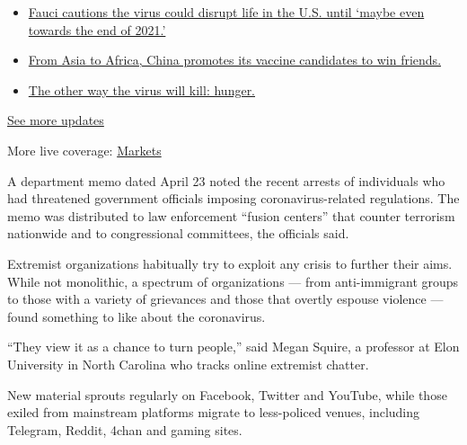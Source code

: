 \begin{itemize}
\tightlist
\item
  \href{https://www.nytimes3xbfgragh.onion/2020/09/11/world/covid-19-coronavirus.html?action=click\&pgtype=Article\&state=default\&region=MAIN_CONTENT_1\&context=storylines_live_updates\#link-dfb8a16}{Fauci
  cautions the virus could disrupt life in the U.S. until `maybe even
  towards the end of 2021.'}
\item
  \href{https://www.nytimes3xbfgragh.onion/2020/09/11/world/covid-19-coronavirus.html?action=click\&pgtype=Article\&state=default\&region=MAIN_CONTENT_1\&context=storylines_live_updates\#link-7104d154}{From
  Asia to Africa, China promotes its vaccine candidates to win friends.}
\item
  \href{https://www.nytimes3xbfgragh.onion/2020/09/11/world/covid-19-coronavirus.html?action=click\&pgtype=Article\&state=default\&region=MAIN_CONTENT_1\&context=storylines_live_updates\#link-393ad215}{The
  other way the virus will kill: hunger.}
\end{itemize}

\href{https://www.nytimes3xbfgragh.onion/2020/09/11/world/covid-19-coronavirus.html?action=click\&pgtype=Article\&state=default\&region=MAIN_CONTENT_1\&context=storylines_live_updates}{See
more updates}

More live coverage:
\href{https://www.nytimes3xbfgragh.onion/live/2020/09/11/business/stock-market-today-coronavirus?action=click\&pgtype=Article\&state=default\&region=MAIN_CONTENT_1\&context=storylines_live_updates}{Markets}

A department memo dated April 23 noted the recent arrests of individuals
who had threatened government officials imposing coronavirus-related
regulations. The memo was distributed to law enforcement ``fusion
centers'' that counter terrorism nationwide and to congressional
committees, the officials said.

Extremist organizations habitually try to exploit any crisis to further
their aims. While not monolithic, a spectrum of organizations --- from
anti-immigrant groups to those with a variety of grievances and those
that overtly espouse violence --- found something to like about the
coronavirus.

``They view it as a chance to turn people,'' said Megan Squire, a
professor at Elon University in North Carolina who tracks online
extremist chatter.

New material sprouts regularly on Facebook, Twitter and YouTube, while
those exiled from mainstream platforms migrate to less-policed venues,
including Telegram, Reddit, 4chan and gaming sites.

